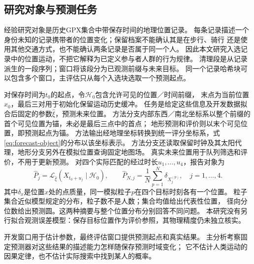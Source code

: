 \subsection{研究对象与预测任务}\label{sec:forecast-task}
经验研究对象是历史GPX集合中带保存时间的地理位置记录。
每条记录描述一个身份未知的记录携带者的位置变化；保留档案不能确认其是在步行、骑行
还是使用其他交通方式，也不能确认两条记录是否属于同一个人。
因此本文研究入选记录中的位置运动，不把它解释为已定义参与者人群的行为规律。
清理段是从记录派生的一段序列；窗口将该段分为已观测前缀与未来目标。
同一个记录哈希块可以包含多个窗口，主评估只从每个入选块选取一个预测起点。

对保存时间为$t_0$的起点，令$\mathcal H_0$包含允许可见的位置／时间前缀，
末点为当前位置$x_0$，最后三对用于初始化保留运动历史缓冲。
任务是给定这些信息及开发数据拟合后固定的参数$\widehat\xi$，预测未来位置。
方法分支内部东西／南北坐标系以整个前缀的首个可见位置为锚，未必是最后三点中的首点；
地形预测和评价则以末个可见位置，即预测起点为锚。
方法输出经地理坐标转换到统一评分坐标系，式\eqref{eq:forecast-object}的分布以该坐标表示。
方法分支还读取保留时钟及其太阳代理，地形分支另外在模拟位置查询固定地图场。
真实未来位置用于队列筛选和评价，不用于更新预测。
对四个实际匹配的经过时长$u_1,\ldots,u_4$，报告对象为
\begin{equation}\label{eq:forecast-object}
 \widehat P_j=\mathcal L_{\widehat\xi}(X_{t_0+u_j}\mid\mathcal H_0),
 \qquad
 \widehat P_{N,j}=\frac1N\sum_{p=1}^{N}\delta_{X_j^{(p)}},
 \quad j=1,\ldots,4 .
\end{equation}
其中$\delta_x$是位置$x$处的点质量，同一模拟粒子$p$在四个目标时刻各有一个位置。
粒子集合近似模型规定的分布，粒子数不是人数；集合均值给出代表性位置，
径向分位数给出预测圆。这两种摘要与整个位置分布分别回答不同问题。
本研究没有另行拟合观测误差模型：保存目标位置作为评价参照，其物理精度仍未独立核实。

开发窗口用于估计参数，最终评估窗口提供预测起点和真实结果。
主分析考察固定预测器对这些结果的描述能力怎样随保存预测时域变化；
它不估计人类运动的因果定律，也不估计实际搜索中找到某人的概率。
